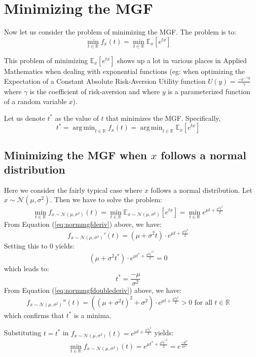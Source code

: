 \documentclass[10pt]{amsart}
\DeclareMathOperator*{\argmin}{arg\,min}
\begin{document}
\section{Minimizing the MGF}
Now let us consider the problem of minimizing the MGF. The problem is to:
$$\min_{t\in \mathbb{R}} f_x(t) = \min_{t\in \mathbb{R}} \mathbb{E}_x[e^{tx}]$$

This problem of minimizing $\mathbb{E}_x[e^{tx}]$ shows up a lot in various places in Applied Mathematics when dealing with exponential functions (eg: when optimizing the Expectation of a Constant Absolute Risk-Aversion Utility function $U(y) = \frac {-e^{-\gamma y}} {\gamma}$ where $\gamma$ is the coefficient of risk-aversion and where $y$ is a parameterized function of a random variable $x$).

Let us denote $t^*$ as the value of $t$ that minimizes the MGF. Specifically,
$$t^* = \argmin_{t\in \mathbb{R}} f_x(t) = \argmin_{t \in \mathbb{R}} \mathbb{E}_x[e^{tx}]$$

\subsection{Minimizing the MGF when $x$ follows a normal distribution}
Here we consider the fairly typical case where $x$ follows a normal distribution. Let $x\sim \mathcal{N}(\mu, \sigma^2)$. Then we have to solve the problem:
$$\min_{t\in \mathbb{R}} f_{x\sim \mathcal{N}(\mu, \sigma^2)}(t) = \min_{t\in \mathbb{R}} \mathbb{E}_{x\sim \mathcal{N}(\mu, \sigma^2)}[e^{tx}] = \min_{t\in \mathbb{R}} e^{\mu t + \frac {\sigma^2 t^2} 2}$$
From Equation (\ref{eq:normmgfderiv}) above, we have:
$$f_{x\sim \mathcal{N}(\mu, \sigma^2)}'(t) = (\mu + \sigma^2t)\cdot e^{\mu t + \frac {\sigma^2 t^2} 2}$$
Setting this to 0 yields:
$$(\mu + \sigma^2t^*)\cdot e^{\mu t^* + \frac {\sigma^2 {t^*}^2} 2} = 0$$
which leads to:
\begin{equation}
t^* = \frac {-\mu} {\sigma^2}
\end{equation}
From Equation (\ref{eq:normmgfdoublederiv}) above, we have:
$$f_{x\sim \mathcal{N}(\mu, \sigma^2)}''(t) = ((\mu + \sigma^2t)^2 + \sigma^2)\cdot e^{\mu t + \frac {\sigma^2 t^2} 2} > 0 \mbox{ for all } t \in \mathbb{R}$$
which confirms that $t^*$ is a minima.

Substituting $t=t^*$ in $f_{x\sim \mathcal{N}(\mu, \sigma^2)}(t) = e^{\mu t + \frac {\sigma^2 t^2} 2}$ yields:
\begin{equation}
\min_{t\in \mathbb{R}} f_{x\sim \mathcal{N}(\mu, \sigma^2)}(t) = e^{\mu t^* + \frac {\sigma^2 {t^*}^2} 2} = e^{\frac {-\mu^2} {2\sigma^2}}
\end{equation}
\end{document}
